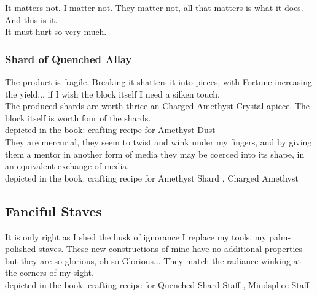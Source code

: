 \documentclass[12pt]{article}
\begin{document}
  It matters not. I matter not. They matter not, all that matters is what it does. And this is it.\\It must hurt so very much.\\


  
  \subsubsection*{ Shard of Quenched Allay }
      The product is fragile. Breaking it shatters it into pieces, with Fortune increasing the yield... if I wish the block itself I need a silken touch.\\The produced shards are worth thrice an Charged Amethyst Crystal apiece. The block itself is worth four of the shards.\\



  
  depicted in the book: crafting recipe for 
    Amethyst Dust
\\

      They are mercurial, they seem to twist and wink under my fingers, and by giving them a mentor in another form of media they may be coerced into its shape, in an equivalent exchange of media.\\



  
  depicted in the book: crafting recipe for 
    Amethyst Shard
,     Charged Amethyst
\\

      


\newpage

\label{sec:greatwork/fanciful_staves}
\subsection*{Fanciful Staves}


  
    It is only right as I shed the husk of ignorance I replace my tools, my palm-polished staves. These new constructions of mine have no additional properties -- but they are so glorious, oh so Glorious... They match the radiance winking at the corners of my sight.\\


  
  depicted in the book: crafting recipe for 
    Quenched Shard Staff
,     Mindsplice Staff
\\

      
\end{document}
